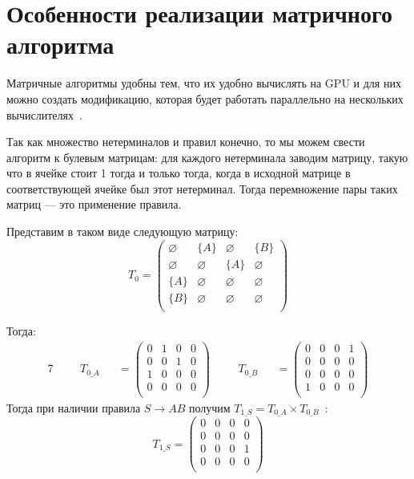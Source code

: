 \section{Особенности реализации матричного алгоритма}

Матричные алгоритмы удобны тем, что их удобно вычислять на GPU и для них можно создать модификацию, которая будет работать параллельно на нескольких вычислителях~\cite{Mishin:2019:ECP:3327964.3328503}.

Так как множество нетерминалов и правил конечно, то мы можем свести алгоритм к булевым матрицам: для каждого нетерминала заводим матрицу, такую что в ячейке стоит 1 тогда и только тогда, когда в исходной матрице в соответствующей ячейке был этот нетерминал.
Тогда перемножение пары таких матриц --- это применение правила.


\begin{example}
Представим в таком виде следующую матрицу:
\[
T_0 = \begin{pmatrix}
\varnothing & \{A\}       & \varnothing & \{B\}       \\
\varnothing & \varnothing & \{A\}       & \varnothing \\
\{A\}       & \varnothing & \varnothing & \varnothing \\
\{B\}       & \varnothing & \varnothing & \varnothing \\
\end{pmatrix}
\]

Тогда:
\begin{alignat*}{7}
& &&T_{0\_A} &&= \begin{pmatrix}
0 & 1       & 0 & 0       \\
0 & 0 & 1       & 0 \\
1  & 0 & 0 & 0       \\
0       & 0 & 0 & 0 \\
\end{pmatrix} \ \ \ \ &&T_{0\_B} &&= \begin{pmatrix}
0 & 0       & 0 & 1       \\
0       & 0 & 0       & 0 \\
0  & 0 & 0 & 0       \\
1       & 0 & 0 & 0 \\
\end{pmatrix}
\end{alignat*}
Тогда при наличии правила $S \to A B$ получим $T_{1\_S} =T_{0\_A} \times T_{0\_B}$~:
\[
T_{1\_S} = \begin{pmatrix}
0 & 0       & 0 & 0       \\
0       & 0 & 0       & 0 \\
0  & 0 & 0 & 1       \\
0       & 0 & 0 & 0 \\
\end{pmatrix}
\]
\end{example}

